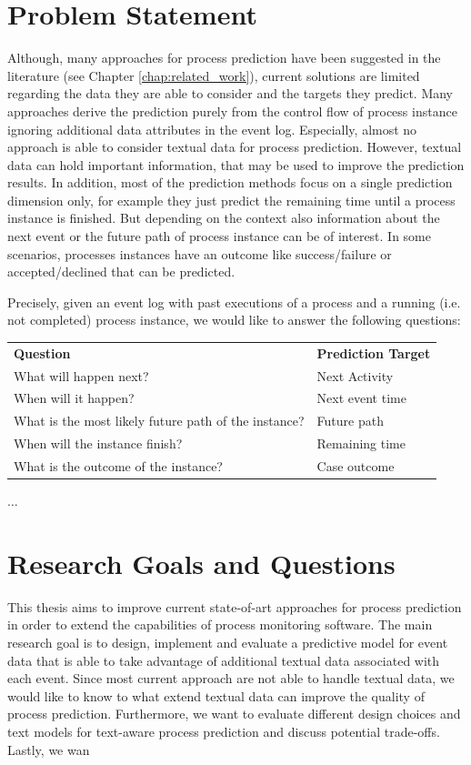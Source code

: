 \section{Problem Statement}

Although, many approaches for process prediction have been suggested in the literature (see Chapter \ref{chap:related_work}), current solutions are limited regarding the data they are able to consider and the targets they predict.
Many approaches derive the prediction purely from the control flow of process instance ignoring additional data attributes in the event log.
Especially, almost no approach is able to consider textual data for process prediction.
However, textual data can hold important information, that may be used to improve the prediction results.
In addition, most of the prediction methods focus on a single prediction dimension only, for example they just predict the remaining time until a process instance is finished.
But depending on the context also information about the next event or the future path of process instance can be of interest.
In some scenarios, processes instances have an outcome like success/failure or accepted/declined that can be predicted.

Precisely, given an event log with past executions of a process and a running (i.e. not completed) process instance, we would like to answer the following questions:

\begin{tabular}{ll}
	\textbf{Question} & \textbf{Prediction Target} \\
	What will happen next? & Next Activity\\
	When will it happen? & Next event time\\
	What is the most likely future path of the instance? & Future path\\
	When will the instance finish? & Remaining time\\
	What is the outcome of the instance? & Case outcome
\end{tabular}



$\dots$

\section{Research Goals and Questions}

This thesis aims to improve current state-of-art approaches for process prediction in order to extend the capabilities of process monitoring software.
The main research goal is to design, implement and evaluate a predictive model for event data that is able to take advantage of additional textual data associated with each event.
Since most current approach are not able to handle textual data, we would like to know to what extend textual data can improve the quality of process prediction.
Furthermore, we want to evaluate different design choices and text models for text-aware process prediction and discuss potential trade-offs.
Lastly, we wan

